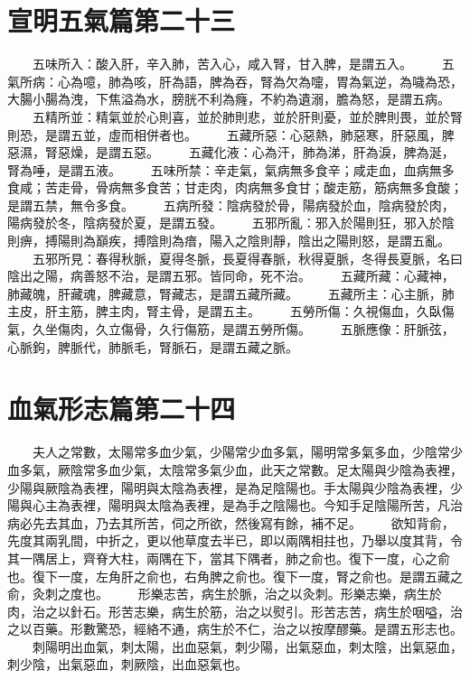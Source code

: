 \section{宣明五氣篇第二十三}

　　五味所入：酸入肝，辛入肺，苦入心，咸入腎，甘入脾，是謂五入。
　　五氣所病：心為噫，肺為咳，肝為語，脾為吞，腎為欠為嚏，胃為氣逆，為噦為恐，大腸小腸為洩，下焦溢為水，膀胱不利為癃，不約為遺溺，膽為怒，是謂五病。
　　五精所並：精氣並於心則喜，並於肺則悲，並於肝則憂，並於脾則畏，並於腎則恐，是謂五並，虛而相併者也。
　　五藏所惡：心惡熱，肺惡寒，肝惡風，脾惡濕，腎惡燥，是謂五惡。
　　五藏化液：心為汗，肺為涕，肝為淚，脾為涎，腎為唾，是謂五液。
　　五味所禁：辛走氣，氣病無多食辛；咸走血，血病無多食咸；苦走骨，骨病無多食苦；甘走肉，肉病無多食甘；酸走筋，筋病無多食酸；是謂五禁，無令多食。
　　五病所發：陰病發於骨，陽病發於血，陰病發於肉，陽病發於冬，陰病發於夏，是謂五發。
　　五邪所亂：邪入於陽則狂，邪入於陰則痹，搏陽則為巔疾，搏陰則為瘖，陽入之陰則靜，陰出之陽則怒，是謂五亂。
　　五邪所見：春得秋脈，夏得冬脈，長夏得春脈，秋得夏脈，冬得長夏脈，名曰陰出之陽，病善怒不治，是謂五邪。皆同命，死不治。
　　五藏所藏：心藏神，肺藏魄，肝藏魂，脾藏意，腎藏志，是謂五藏所藏。
　　五藏所主：心主脈，肺主皮，肝主筋，脾主肉，腎主骨，是謂五主。
　　五勞所傷：久視傷血，久臥傷氣，久坐傷肉，久立傷骨，久行傷筋，是謂五勞所傷。
　　五脈應像：肝脈弦，心脈鉤，脾脈代，肺脈毛，腎脈石，是謂五藏之脈。


\section{血氣形志篇第二十四}

　　夫人之常數，太陽常多血少氣，少陽常少血多氣，陽明常多氣多血，少陰常少血多氣，厥陰常多血少氣，太陰常多氣少血，此天之常數。足太陽與少陰為表裡，少陽與厥陰為表裡，陽明與太陰為表裡，是為足陰陽也。手太陽與少陰為表裡，少陽與心主為表裡，陽明與太陰為表裡，是為手之陰陽也。今知手足陰陽所苦，凡治病必先去其血，乃去其所苦，伺之所欲，然後寫有餘，補不足。
　　欲知背俞，先度其兩乳間，中折之，更以他草度去半已，即以兩隅相拄也，乃舉以度其背，令其一隅居上，齊脊大柱，兩隅在下，當其下隅者，肺之俞也。復下一度，心之俞也。復下一度，左角肝之俞也，右角脾之俞也。復下一度，腎之俞也。是謂五藏之俞，灸刺之度也。
　　形樂志苦，病生於脈，治之以灸刺。形樂志樂，病生於肉，治之以針石。形苦志樂，病生於筋，治之以熨引。形苦志苦，病生於咽嗌，治之以百藥。形數驚恐，經絡不通，病生於不仁，治之以按摩醪藥。是謂五形志也。
　　刺陽明出血氣，刺太陽，出血惡氣，刺少陽，出氣惡血，刺太陰，出氣惡血，刺少陰，出氣惡血，刺厥陰，出血惡氣也。

